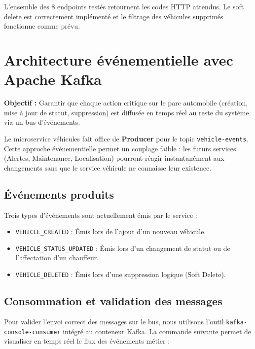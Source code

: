 \documentclass[12pt,a4paper]{article}
\begin{document}
\vspace{0.3cm}
L'ensemble des 8 endpoints testés retournent les codes HTTP attendus. Le soft delete
est correctement implémenté et le filtrage des véhicules supprimés fonctionne comme
prévu.

\newpage
\section{Architecture événementielle avec Apache Kafka}

\begin{infobox}
\textbf{Objectif :} Garantir que chaque action critique sur le parc automobile (création, mise à jour de statut, suppression) est diffusée en temps réel au reste du système via un bus d'événements.
\end{infobox}

\vspace{0.5cm}

Le microservice véhicules fait office de \textbf{Producer} pour le topic \texttt{vehicle-events}. Cette approche événementielle permet un couplage faible : les futurs services (Alertes, Maintenance, Localisation) pourront réagir instantanément aux changements sans que le service véhicule ne connaisse leur existence.

\subsection{Événements produits}
Trois types d'événements sont actuellement émis par le service :
\begin{itemize}
    \item \texttt{VEHICLE\_CREATED} : Émis lors de l'ajout d'un nouveau véhicule.
    \item \texttt{VEHICLE\_STATUS\_UPDATED} : Émis lors d'un changement de statut ou de l'affectation d'un chauffeur.
    \item \texttt{VEHICLE\_DELETED} : Émis lors d'une suppression logique (Soft Delete).
\end{itemize}

\subsection{Consommation et validation des messages}
Pour valider l'envoi correct des messages sur le bus, nous utilisons l'outil \texttt{kafka-console-consumer} intégré au conteneur Kafka. La commande suivante permet de visualiser en temps réel le flux des événements métier :
\end{document}
